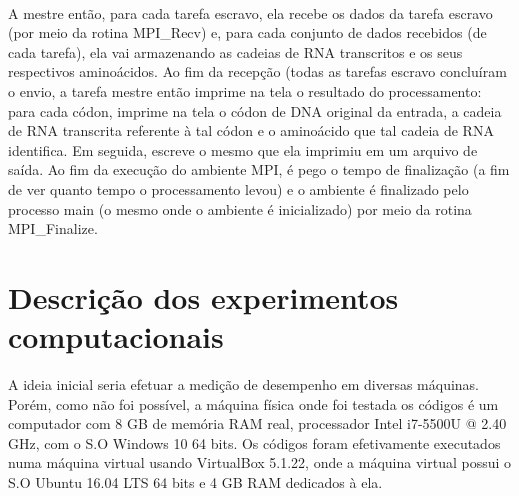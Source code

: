 \documentclass[a4paper,10pt]{article}
\begin{document}
\paragraph{} A mestre então, para cada tarefa escravo, ela recebe os dados da tarefa escravo (por meio da rotina MPI\_Recv) e, para cada conjunto de dados recebidos (de cada tarefa), ela vai armazenando as cadeias de RNA transcritos e os seus respectivos aminoácidos. Ao fim da recepção (todas as tarefas escravo concluíram o envio, a tarefa mestre então imprime na tela o resultado do processamento: para cada códon, imprime na tela o códon de DNA original da entrada, a cadeia de RNA transcrita referente à tal códon e o aminoácido que tal cadeia de RNA identifica. Em seguida, escreve o mesmo que ela imprimiu em um arquivo de saída. Ao fim da execução do ambiente MPI, é pego o tempo de finalização (a fim de ver quanto tempo o processamento levou) e o ambiente é finalizado pelo processo main (o mesmo onde o ambiente é inicializado) por meio da rotina MPI\_Finalize.\\

\newpage

\section{Descrição dos experimentos computacionais}
A ideia inicial seria efetuar a medição de desempenho em diversas máquinas. Porém, como não foi possível, a máquina física onde foi testada os códigos é um computador com 8 GB de memória RAM real, processador Intel i7-5500U @ 2.40 GHz, com o S.O Windows 10 64 bits. Os códigos foram efetivamente executados numa máquina virtual usando VirtualBox 5.1.22, onde a máquina virtual possui o S.O Ubuntu 16.04 LTS 64 bits e 4 GB RAM dedicados à ela.



\end{document}
